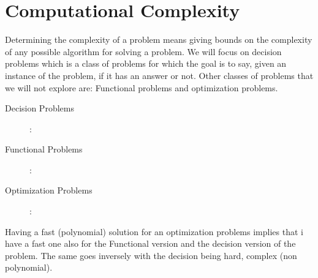 \section*{Computational Complexity}
Determining the complexity of a problem means giving bounds on the complexity of any possible algorithm for solving a problem.
We will focus on decision problems which is a class of problems for which the goal is to say, given an instance of the problem, if it has an answer or not. Other classes of problems that we will not explore are: Functional problems and optimization problems.\\
\begin{description}
    \item[Decision Problems] : 
    \item[Functional Problems] : 
    \item[Optimization Problems] :
\end{description}
Having a fast (polynomial) solution for an optimization problems implies that i have a fast one also for the Functional version and the decision version of the problem. The same goes inversely with the decision being hard, complex (non polynomial).\\
